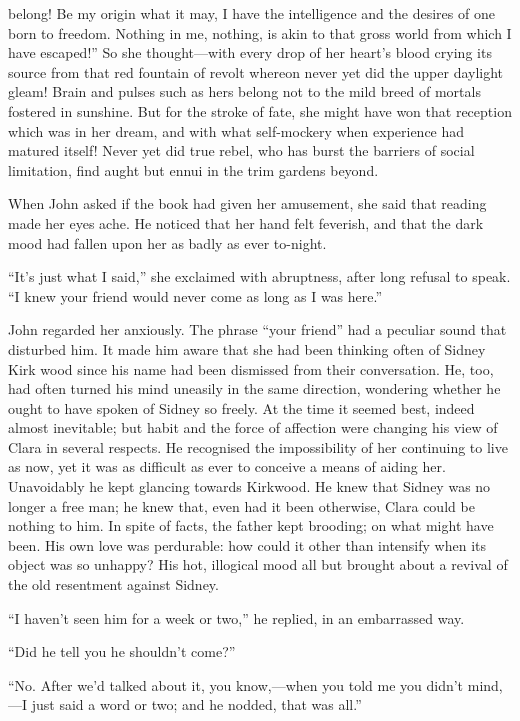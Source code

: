 belong! Be my origin what it may, I have the intelligence and the
desires {\protect\hypertarget{65}{}{}}of one born to freedom. Nothing in
me, nothing, is akin to that gross world from which I have escaped!'' So
she thought---with every drop of her heart's blood crying its source
from that red fountain of revolt whereon never yet did the upper
daylight gleam! Brain and pulses such as hers belong not to the mild
breed of mortals fostered in sunshine. But for the stroke of fate, she
might have won that reception which was in her dream, and with what
self-mockery when experience had matured itself! Never yet did true
rebel, who has burst the barriers of social limitation, find aught but
ennui in the trim gardens beyond.

When John asked if the book had given her amusement, she said that
reading made her eyes ache. He noticed that her hand felt feverish, and
that the dark mood had fallen upon her as badly as ever to-night.

``It's just what I said,'' she exclaimed with abruptness, after long
refusal to speak. ``I knew your friend would never come as long as I was
here.''

John regarded her anxiously. The phrase ``your friend'' had a peculiar
sound that disturbed him. It made him aware that she had
{\protect\hypertarget{66}{}{}}been thinking often of Sidney Kirk wood
since his name had been dismissed from their conversation. He, too, had
often turned his mind uneasily in the same direction, wondering whether
he ought to have spoken of Sidney so freely. At the time it seemed best,
indeed almost inevitable; but habit and the force of affection were
changing his view of Clara in several respects. He recognised the
impossibility of her continuing to live as now, yet it was as difficult
as ever to conceive a means of aiding her. Unavoidably he kept glancing
towards Kirkwood. He knew that Sidney was no longer a free man; he knew
that, even had it been otherwise, Clara could be nothing to him. In
spite of facts, the father kept brooding; on what might have been. His
own love was perdurable: how could it other than intensify when its
object was so unhappy? His hot, illogical mood all but brought about a
revival of the old resentment against Sidney.

``I haven't seen him for a week or two,'' he replied, in an embarrassed
way.

``Did he tell you he shouldn't come?''

``No. After we'd talked about it, you know,---when you told me you
didn't mind,---I just {\protect\hypertarget{67}{}{}}said a word or two;
and he nodded, that was all.''

